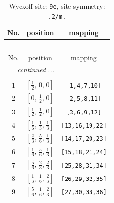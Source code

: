 \documentclass[fleqn,8pt]{jsarticle}
\begin{document}
\begin{longtable}{ccc}
\caption{Wyckoff site: {\tt 9e}, site symmetry: {\tt .2/m.}}
 \\
 \hline \hline
No. & position & mapping \\ \hline \endfirsthead

\multicolumn{2}{l}{\tablename\ \thetable{}} \\
 \hline \hline
No. & position & mapping \\ \hline \endhead

 \hline \hline
\multicolumn{2}{r}{\footnotesize\it continued ...} \\ \endfoot

 \hline \hline
\multicolumn{2}{r}{} \\ \endlastfoot

1 & $\left[ \frac{1}{2},\, 0,\, 0 \right]$ & {\tt [1,4,7,10]} \\ \hline
2 & $\left[ 0,\, \frac{1}{2},\, 0 \right]$ & {\tt [2,5,8,11]} \\ \hline
3 & $\left[ \frac{1}{2},\, \frac{1}{2},\, 0 \right]$ & {\tt [3,6,9,12]} \\ \hline
4 & $\left[ \frac{1}{6},\, \frac{1}{3},\, \frac{1}{3} \right]$ & {\tt [13,16,19,22]} \\ \hline
5 & $\left[ \frac{2}{3},\, \frac{5}{6},\, \frac{1}{3} \right]$ & {\tt [14,17,20,23]} \\ \hline
6 & $\left[ \frac{1}{6},\, \frac{5}{6},\, \frac{1}{3} \right]$ & {\tt [15,18,21,24]} \\ \hline
7 & $\left[ \frac{5}{6},\, \frac{2}{3},\, \frac{2}{3} \right]$ & {\tt [25,28,31,34]} \\ \hline
8 & $\left[ \frac{1}{3},\, \frac{1}{6},\, \frac{2}{3} \right]$ & {\tt [26,29,32,35]} \\ \hline
9 & $\left[ \frac{5}{6},\, \frac{1}{6},\, \frac{2}{3} \right]$ & {\tt [27,30,33,36]} \\
\end{longtable}
\renewcommand{\arraystretch}{1.2}
\end{document}
